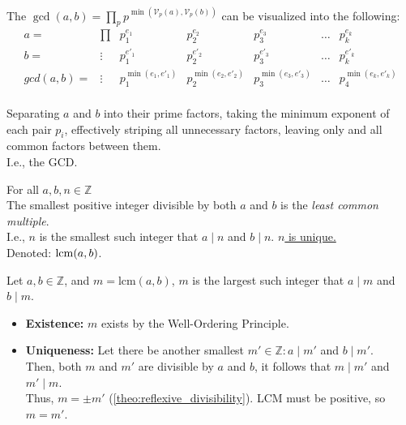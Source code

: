 \begin{Proof}

    \label{proof:gcd_abstracted}

    The $\gcd(a,b) = \prod_{p} p^{\min(\mathcal{V}_p(a),\mathcal{V}_p(b))}$ can be visualized into the following:
    \[
    \begin{array}{ccc|c|c|c|c}
    
    a=&\prod&p_1^{e_1} & p_2^{e_2} & p_3^{e_3} & \dots & p_k^{e_k} \\
    b=&\vdots&p_1^{e'_1} & p_2^{e'_2} & p_3^{e'_3} & \dots & p_k^{e'_k} \\
    \hline
    gcd(a,b)=&\vdots&p_1^{\min(e_1, e'_1)} & p_2^{\min(e_2, e'_2)} & p_3^{\min(e_3, e'_3)} & \dots & p_4^{\min(e_k, e'_k)} \\

    \end{array}
    \]

    \noindent
    Separating $a$ and $b$ into their prime factors, taking the minimum exponent of each pair $p_i$,
    effectively striping all unnecessary factors, leaving only and all common factors between them.\\
    
    \noindent
    I.e., the GCD.

\end{Proof}

\begin{Def}

    For all $a,b,n\in\mathbb{Z}$\\
    The smallest positive integer divisible by both $a$ and $b$ is the \textit{least common multiple}.\\
    I.e., $n$ is the smallest such integer that $a\mid n$ and $b\mid n$. \underline{$n$ is unique.}\\

    \noindent
    Denoted: $\operatorname{lcm}(a,b)$.
\end{Def}


\begin{Proof}

    \label{proof:lcm_existence_uniqueness}

    Let $a,b\in\mathbb{Z}$, and $m=\text{lcm}(a,b)$, $m$ is the largest such integer that $a\mid m$ and $b\mid m$.
    \begin{itemize}
        \item  \textbf{Existence:} $m$ exists by the Well-Ordering Principle.
        \item \textbf{Uniqueness:} Let there be another smallest $m'\in\mathbb{Z}:a\mid m'$ and $b\mid m'$.\\
        Then, both $m$ and $m'$ are divisible by $a$ and $b$, it follows that $m \mid m'$ and $m' \mid m$.\\
        Thus, $m=\pm m'$ (\ref{theo:reflexive_divisibility}). LCM must be positive, so $m = m'$.
    \end{itemize}
\end{Proof}

